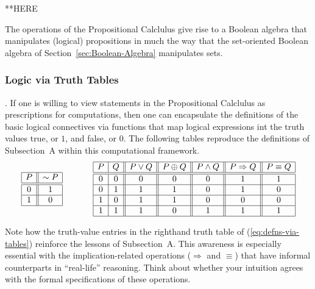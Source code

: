 \medskip


**HERE

The operations of the Propositional Calclulus give rise to a Boolean
algebra that manipulates (logical) propositions in much the way that
the set-oriented Boolean algebra of Section~\ref{sec:Boolean-Algebra}
manipulates sets.


\subsubsection{Logic via Truth Tables}

.
%
If one is willing to view statements in the Propositional Calclulus as
prescriptions for computations, then one can encapsulate the
definitions of the basic logical connectives via functions that map
logical expressions int the truth values {\small\sf true}, or $1$, and
{\small\sf false}, or $0$.  The following tables reproduce the
definitions of Subsection~A within this computational framework.
\begin{equation}
\label{eq:defns-via-tables}
\begin{array}{|c||c|}
\hline
P & \sim P \\
\hline
\hline
0 & 1 \\
\hline
1 & 0 \\
\hline
\end{array}
\hspace*{.5in}
\begin{array}{|c|c||c||c||c||c||c|}
\hline
P & Q & P \vee Q  & P \oplus Q & P \wedge Q & P \Rightarrow Q & P \equiv Q  \\
\hline
\hline
0 & 0 & 0 & 0 & 0 & 1 & 1 \\
\hline
0 & 1 & 1 & 1 & 0 & 1 & 0 \\
\hline
1 & 0 & 1 & 1 & 0 & 0 & 0 \\
\hline
1 & 1 & 1 & 0 & 1 & 1 & 1 \\
\hline
\end{array}
\end{equation}

Note how the truth-value entries in the righthand truth table of
(\ref{eq:defns-via-tables}) reinforce the lessons of Subsection~A.
This awareness is especially essential with the implication-related
operations ($\Rightarrow$ and $\equiv$) that have informal
counterparts in ``real-life'' reasoning.  Think about whether your
intuition agrees with the formal specifications of these operations.

